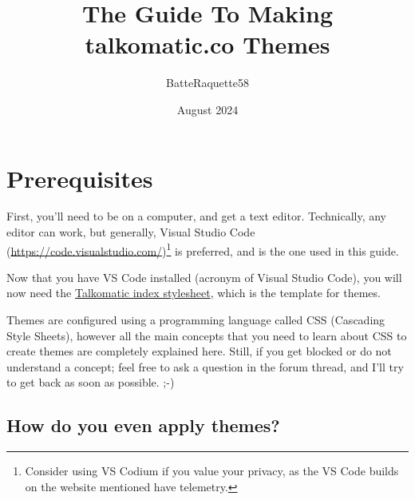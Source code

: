 \documentclass{article}
\title{The Guide To Making talkomatic.co Themes}
\author{BatteRaquette58 }
\date{August 2024}
\begin{document}
\maketitle
\tableofcontents
\clearpage

\maketitle

\section{Prerequisites}

First, you’ll need to be on a computer, and get a text editor. Technically, any editor can work, but generally, Visual Studio Code (\url{https://code.visualstudio.com/})\footnote{Consider using VS Codium if you value your privacy, as the VS Code builds on the website mentioned have telemetry.} is preferred, and is the one used in this guide.

Now that you have VS Code installed (acronym of Visual Studio Code), you will now need the \href{https://discord.com/channels/1252540401072607355/1253474521537577030/1276435400377765970}{Talkomatic index stylesheet}, which is the template for themes.

Themes are configured using a programming language called CSS (Cascading Style Sheets), however all the main concepts that you need to learn about CSS to create themes are completely explained here. Still, if you get blocked or do not understand a concept; feel free to ask a question in the forum thread, and I'll try to get back as soon as possible. ;-)
\clearpage

\subsection{How do you even apply themes?}
\end{document}
